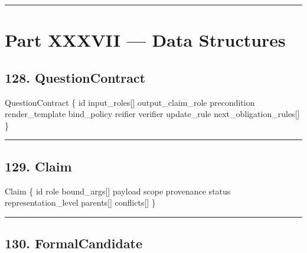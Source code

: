 \documentclass[
]{article}
\newenvironment{Shaded}{}{}
\newcommand{\NormalTok}[1]{#1}
\begin{document}
\begin{center}\rule{0.5\linewidth}{0.5pt}\end{center}

\section{Part XXXVII --- Data
Structures}\label{part-xxxvii-data-structures}

\subsection{128. QuestionContract}\label{questioncontract}

\begin{Shaded}
\begin{Highlighting}[]
\NormalTok{QuestionContract \{}
\NormalTok{    id}
\NormalTok{    input\_roles[]}
\NormalTok{    output\_claim\_role}
\NormalTok{    precondition}
\NormalTok{    render\_template}
\NormalTok{    bind\_policy}
\NormalTok{    reifier}
\NormalTok{    verifier}
\NormalTok{    update\_rule}
\NormalTok{    next\_obligation\_rules[]}
\NormalTok{\}}
\end{Highlighting}
\end{Shaded}

\begin{center}\rule{0.5\linewidth}{0.5pt}\end{center}

\subsection{129. Claim}\label{claim}

\begin{Shaded}
\begin{Highlighting}[]
\NormalTok{Claim \{}
\NormalTok{    id}
\NormalTok{    role}
\NormalTok{    bound\_args[]}
\NormalTok{    payload}
\NormalTok{    scope}
\NormalTok{    provenance}
\NormalTok{    status}
\NormalTok{    representation\_level}
\NormalTok{    parents[]}
\NormalTok{    conflicts[]}
\NormalTok{\}}
\end{Highlighting}
\end{Shaded}

\begin{center}\rule{0.5\linewidth}{0.5pt}\end{center}

\subsection{130. FormalCandidate}\label{formalcandidate}
\end{document}
